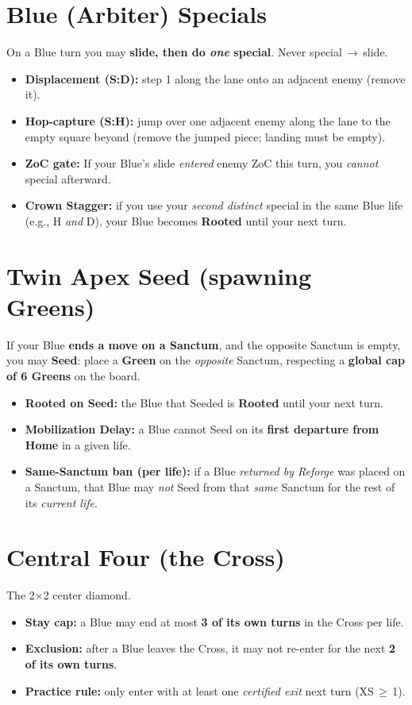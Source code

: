 \documentclass[11pt]{article}
\begin{document}
\section*{Blue (Arbiter) Specials}
On a Blue turn you may \textbf{slide, then do \emph{one} special}. Never special\,$\to$\,slide.
\begin{itemize}
  \item \textbf{Displacement (S:D):} step 1 along the lane onto an adjacent enemy (remove it).
  \item \textbf{Hop-capture (S:H):} jump over one adjacent enemy along the lane to the empty square beyond (remove the jumped piece; landing must be empty).
  \item \textbf{ZoC gate:} If your Blue's slide \emph{entered} enemy ZoC this turn, you \emph{cannot} special afterward.
  \item \textbf{Crown Stagger:} if you use your \emph{second distinct} special in the same Blue life (e.g., H \emph{and} D), your Blue becomes \textbf{Rooted} until your next turn.
\end{itemize}

\section*{Twin Apex Seed (spawning Greens)}
If your Blue \textbf{ends a move on a Sanctum}, and the opposite Sanctum is empty, you may \textbf{Seed}: place a \textbf{Green} on the \emph{opposite} Sanctum, respecting a \textbf{global cap of 6 Greens} on the board.
\begin{itemize}
  \item \textbf{Rooted on Seed:} the Blue that Seeded is \textbf{Rooted} until your next turn.
  \item \textbf{Mobilization Delay:} a Blue cannot Seed on its \textbf{first departure from Home} in a given life.
  \item \textbf{Same-Sanctum ban (per life):} if a Blue \emph{returned by Reforge} was placed on a Sanctum, that Blue may \emph{not} Seed from that \emph{same} Sanctum for the rest of its \emph{current life}.
\end{itemize}

\section*{Central Four (the Cross)}
The 2$\times$2 center diamond.
\begin{itemize}
  \item \textbf{Stay cap:} a Blue may end at most \textbf{3 of its own turns} in the Cross per life.
  \item \textbf{Exclusion:} after a Blue leaves the Cross, it may not re-enter for the next \textbf{2 of its own turns}.
  \item \textbf{Practice rule:} only enter with at least one \emph{certified exit} next turn (XS\,$\ge$\,1).
\end{itemize}
\end{document}
